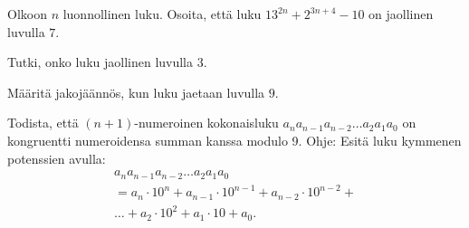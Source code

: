 \begin{tehtavasivu}
\begin{tehtava}
  Olkoon $n$ luonnollinen luku. Osoita, että luku $13^{2n} + 2^{3n+4} - 10$ on jaollinen luvulla $7$.
\end{tehtava}

\begin{tehtava}
  Tutki, onko luku jaollinen luvulla $3$.
  \begin{alakohdat}
  \end{alakohdat}
\end{tehtava}

\begin{tehtava}
  Määritä jakojäännös, kun luku jaetaan luvulla $9$.
  \begin{alakohdat}
  \end{alakohdat}
\end{tehtava}

\begin{tehtava}
  Todista, että $(n+1)$-numeroinen kokonaisluku $a_na_{n-1}a_{n-2}\ldots a_2a_1a_0$ on kongruentti numeroidensa summan kanssa modulo 9. Ohje: Esitä luku kymmenen potenssien avulla:
  \begin{multline*}
  a_na_{n-1}a_{n-2}\ldots a_2a_1a_0\\ = a_n \cdot 10^n + a_{n-1}\cdot 10^{n-1} + a_{n-2} \cdot 10^{n-2} + \\
  \ldots + a_2 \cdot 10^2 + a_1 \cdot 10 + a_0.
  \end{multline*}
\end{tehtava}

\begin{tehtava}
  \begin{alakohdat}
  \end{alakohdat}
\end{tehtava}

\end{tehtavasivu}


